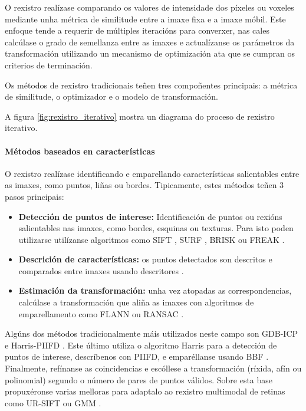 O rexistro realízase comparando os valores de intensidade dos píxeles ou voxeles mediante unha métrica de similitude entre a imaxe fixa e a imaxe móbil.
Este enfoque tende a requerir de múltiples iteracións para converxer, nas cales calcúlase o grado de semellanza entre as imaxes e
actualízanse os parámetros da transformación utilizando un mecanismo de optimización ata que se cumpran os criterios de terminación.

Os métodos de rexistro tradicionais teñen tres compoñentes principais: a métrica de similitude, o optimizador e o modelo de transformación. 

A figura \ref{fig:rexistro_iterativo} mostra un diagrama do proceso de rexistro iterativo.


\paragraph{Métodos baseados en características}
\label{par:Métodos baseados en características}

O rexistro realízase identificando e emparellando características salientables entre as imaxes, como puntos, liñas ou bordes.
Tipicamente, estes métodos teñen 3 pasos principais:

\begin{itemize}
\item \textbf{Detección de puntos de interese:} Identificación de puntos ou rexións salientables nas imaxes, como bordes, esquinas ou texturas. Para isto poden utilizarse utilízanse algoritmos como SIFT \cite{sift}, SURF \cite{surf}, BRISK \cite{brisk} ou FREAK \cite{freakkeypoint}.
\item \textbf{Descrición de características:}  os puntos detectados son descritos e comparados entre imaxes usando descritores .
\item \textbf{Estimación da transformación:} unha vez atopadas as correspondencias, calcúlase a transformación que aliña as imaxes con algoritmos de emparellamento como FLANN \cite{flann} ou RANSAC \cite{ransac}.
\end{itemize}

Algúns dos métodos tradicionalmente máis utilizados neste campo son \gls{GDB-ICP} \cite{GDB-ICP} e Harris-PIIFD \cite{piifd}. Este último utiliza o algoritmo Harris \cite{Harris1988ACC} para a detección de puntos de interese, descríbenos con \gls{PIIFD}, e emparéllanse usando \gls{BBF} \cite{BBF}.
 Finalmente, refínanse as coincidencias e escóllese a transformación (ríxida, afín ou polinomial) segundo o número de pares de puntos válidos. Sobre esta base propuxéronse varias melloras para adaptalo ao rexistro multimodal de retinas como UR-SIFT \cite{ur-sift} ou \gls{GMM} \cite{GMM}.

